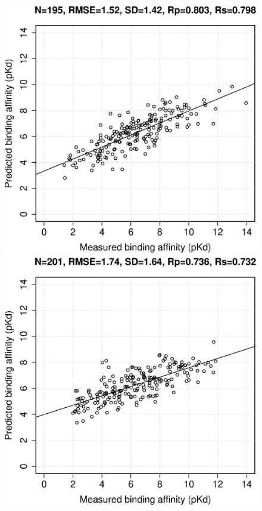 \documentclass[journal=jacsat,manuscript=article]{achemso}
\begin{document}
\begin{figure}[ht!]
\\
\includegraphics[width=\linewidth]{../rfcyscore/x46/rf/trn-1105-tst-195-yp.eps}
\endminipage
{}
\includegraphics[width=\linewidth]{../rfcyscore/x46/rf/trn-2696-tst-201-yp.eps}

\end{figure}
\end{document}
